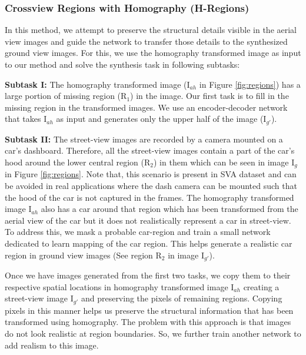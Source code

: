 \documentclass[times,twocolumn,final,authoryear]{elsarticle_modified}
\begin{document}
\subsubsection{Crossview Regions with Homography (H-Regions)}
In this method, we attempt to preserve the structural details visible in the aerial view images and guide the network to transfer those details to the synthesized ground view images. For this, we use the homography transformed image as input to our method and solve the synthesis task in following subtasks:









\textbf{Subtask I: }
The homography transformed image (I$_{ah}$ in Figure \ref{fig:regions}) has a large portion of missing region (R$_1$) in the image. Our first task is to fill in the missing region in the transformed images. We use an encoder-decoder network that takes I$_{ah}$ as input and generates only the upper half of the image (I$_{g'}$). 

\textbf{Subtask II: }
The street-view images are recorded by a camera mounted on a car's dashboard. Therefore, all the street-view images contain a part of the car's hood around the lower central region (R$_2$) in them which can be seen in image I$_{g}$ in Figure \ref{fig:regions}. Note that, this scenario is present in SVA dataset and can be avoided in real applications where the dash camera can be mounted such that the hood of the car is not captured in the frames. The homography transformed image I$_{ah}$ also has a car around that region which has been transformed from the aerial view of the car but it does not realistically represent a car in street-view. To address this, we mask a probable car-region and train a small network dedicated to learn mapping of the car region. This helps generate a realistic car region in ground view images (See region R$_2$ in image I$_{g'}$). 

Once we have images generated from the first two tasks, we copy them to their respective spatial locations in homography transformed image I$_{ah}$ creating a street-view image I$_{g'}$ and preserving the pixels of remaining regions.
Copying pixels in this manner helps us preserve the structural information that has been transformed using homography. The problem with this approach is that images do not look realistic at region boundaries. So, we further train another network to add realism to this image. 
\end{document}
